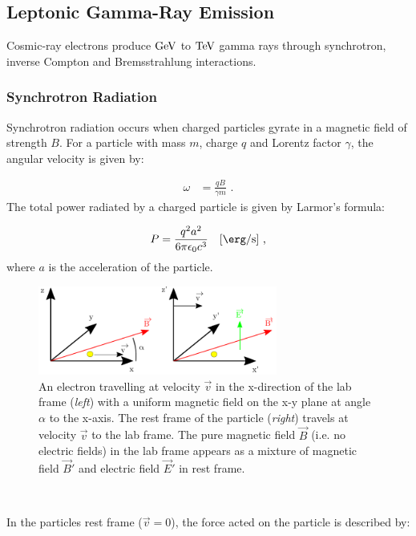 \subsection{Leptonic Gamma-Ray Emission} \label{sec:chapter_1_leptonic_gre}

Cosmic-ray electrons produce $\si{\giga\electronvolt}$ to $\TeV$ gamma rays through synchrotron, inverse Compton and Bremsstrahlung interactions.

\subsubsection{Synchrotron Radiation}

Synchrotron radiation occurs when charged particles gyrate in a magnetic field of strength $B$. For a particle with mass $m$, charge $q$ and Lorentz factor $\gamma$, the angular velocity is given by:

\begin{equation}
    \begin{aligned}
    	\omega &=\frac{qB}{\gamma m}\text{ .}
    \end{aligned}
\end{equation}
\noindent The total power radiated by a charged particle is given by Larmor's formula:

\begin{equation}
    \begin{aligned}
    P=\frac{q^2a^2}{6\pi\epsilon_0c^3}\quad\qty[\si{\ergs\per\second}]\text{ ,}
    \end{aligned}
\end{equation}
\noindent where $a$ is the acceleration of the particle.

\begin{figure}[h!]
	\centering
	\includegraphics[width=0.7\textwidth]{04_Introduction/Images/non_thermal_emission/synchrotron_frames.pdf}
	\caption {An electron travelling at velocity $\vec{v}$ in the x-direction of the lab frame (\textit{left}) with a uniform magnetic field on the x-y plane at angle $\alpha$ to the x-axis. The rest frame of the particle (\textit{right}) travels at velocity $\vec{v}$ to the lab frame. The pure magnetic field $\vec{B}$ (i.e. no electric fields) in the lab frame appears as a mixture of magnetic field $\vec{B}'$ and electric field $\vec{E}'$ in rest frame.}
	\label{fig:chapter_1_non_thermal_sync_frames}
\end{figure}
\par~\par 
In the particles rest frame ($\vec{v}=0$), the force acted on the particle is described by:

